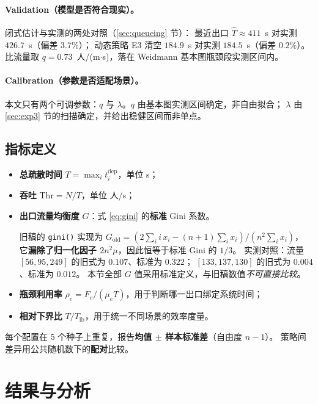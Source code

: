 \paragraph{Validation（模型是否符合现实）。}
闭式估计与实测的两处对照（\ref{sec:queueing} 节）：
最近出口 $\widehat T\approx411$~s 对实测 $426.7$~s（偏差 $3.7\%$）；
动态策略 E3 清空 $184.9$~s 对实测 $184.5$~s（偏差 $0.2\%$）。
比流量取 $q=0.73$~人/(m$\cdot$s)，落在 Weidmann 基本图瓶颈段实测区间内。

\paragraph{Calibration（参数是否适配场景）。}
本文只有两个可调参数：$q$ 与 $\lambda$。$q$ 由基本图实测区间确定，非自由拟合；
$\lambda$ 由 \ref{sec:exp3} 节的扫描确定，并给出稳健区间而非单点。

\subsection{指标定义}
\label{sec:metrics}

\begin{itemize}
  \item \textbf{总疏散时间} $T=\max_i t_i^{\text{dep}}$，单位 s；
  \item \textbf{吞吐} $\mathrm{Thr}=N/T$，单位 人/s；
  \item \textbf{出口流量均衡度} $G$：式 \eqref{eq:gini} 的\textbf{标准} Gini 系数。
        \begin{limitation}
        旧稿的 \texttt{gini()} 实现为
        $G_{\text{old}}=(2\sum_i i\,x_i-(n+1)\sum_i x_i)/(n^2\sum_i x_i)$，
        它\textbf{漏除了归一化因子 $2n^2\mu$}，因此恒等于标准 Gini 的 $1/3$。
        实测对照：流量 $[56,95,249]$ 的旧式为 $0.107$、标准为 $0.322$；
        $[133,137,130]$ 的旧式为 $0.004$、标准为 $0.012$。
        本节全部 $G$ 值采用标准定义，与旧稿数值\emph{不可直接比较}。
        \end{limitation}
  \item \textbf{瓶颈利用率} $\rho_e=F_e/(\mu_e T)$，用于判断哪一出口绑定系统时间；
  \item \textbf{相对下界比} $T/T_{\mathrm{lb}}$，用于统一不同场景的效率度量。
\end{itemize}

每个配置在 5 个种子上重复，报告\textbf{均值 $\pm$ 样本标准差}（自由度 $n-1$）。
策略间差异用公共随机数下的\textbf{配对}比较。

\section{结果与分析}
\label{sec:results}

